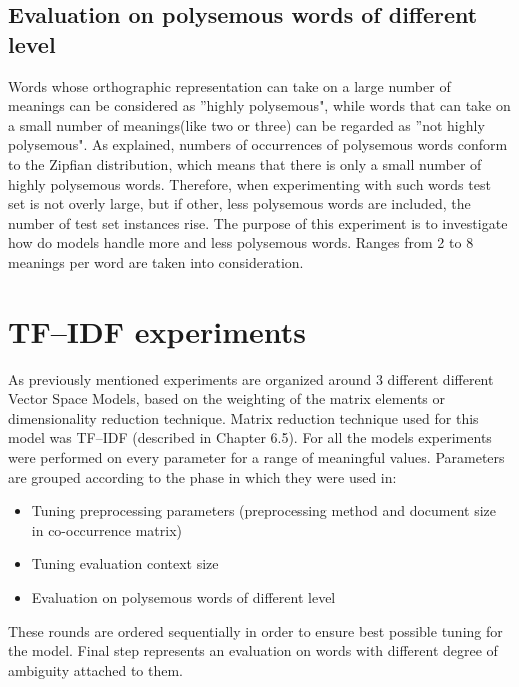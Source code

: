 \subsection{Evaluation on polysemous words of different level } 
Words whose orthographic representation can take on a large number of meanings can be considered
as ''highly polysemous", while words that can take on a small number of meanings(like two or three) can 
be regarded as ''not highly polysemous". As explained, numbers of occurrences of polysemous words 
conform to the Zipfian distribution, which means that there is only a small number of highly polysemous
words. Therefore, when experimenting with such words test set is not overly large, but if other, less
polysemous words are included, the number of test set instances rise. The purpose of this experiment
is to investigate how do models handle more and less polysemous words. Ranges from 2 to 8 meanings per word
are taken into consideration.

\newpage
\section{TF--IDF experiments}
As previously mentioned experiments are organized around 3 different different Vector Space Models, 
based on the weighting of the matrix elements or dimensionality reduction technique. Matrix reduction technique used for this model was TF--IDF (described in Chapter 6.5). For all the models experiments were performed on every parameter for a range of meaningful values. Parameters are grouped according to the phase in which they were used in:
\begin{itemize}
\item Tuning preprocessing parameters (preprocessing method and document size in co-occurrence matrix)
\item Tuning evaluation context size 
\item Evaluation on polysemous words of different level
\end{itemize}
These rounds are ordered sequentially in order to ensure best possible tuning for the model. Final step
represents an evaluation on words with different degree of ambiguity attached to them.

